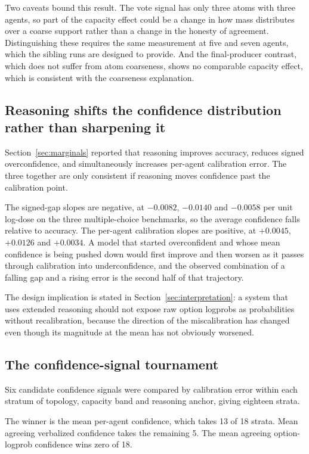 Two caveats bound this result. The vote signal has only three atoms with three agents, so
part of the capacity effect could be a change in how mass distributes over a coarse support
rather than a change in the honesty of agreement. Distinguishing these requires the same
measurement at five and seven agents, which the sibling runs are designed to provide. And
the final-producer contrast, which does not suffer from atom coarseness, shows no
comparable capacity effect, which is consistent with the coarseness explanation.

\subsection{Reasoning shifts the confidence distribution rather than sharpening it}

Section~\ref{sec:marginals} reported that reasoning improves accuracy, reduces signed
overconfidence, and simultaneously increases per-agent calibration error. The three
together are only consistent if reasoning moves confidence past the calibration point.

The signed-gap slopes are negative, at $-0.0082$, $-0.0140$ and $-0.0058$ per unit
log-dose on the three multiple-choice benchmarks, so the average confidence falls relative
to accuracy. The per-agent calibration slopes are positive, at $+0.0045$, $+0.0126$ and
$+0.0034$. A model that started overconfident and whose mean confidence is being pushed
down would first improve and then worsen as it passes through calibration into
underconfidence, and the observed combination of a falling gap and a rising error is the
second half of that trajectory.

The design implication is stated in Section~\ref{sec:interpretation}: a system that uses
extended reasoning should not expose raw option logprobs as probabilities without
recalibration, because the direction of the miscalibration has changed even though its
magnitude at the mean has not obviously worsened.

\subsection{The confidence-signal tournament}

Six candidate confidence signals were compared by calibration error within each stratum of
topology, capacity band and reasoning anchor, giving eighteen strata.

The winner is the mean per-agent confidence, which takes 13 of 18 strata. Mean agreeing
verbalized confidence takes the remaining 5. The mean agreeing option-logprob confidence
wins zero of 18.

